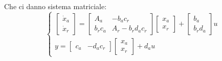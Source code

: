 Che ci danno sistema matriciale:
\[
    \begin{cases}
        \left[\begin{matrix}
            \dot{x}_a\\\dot{x}_r
        \end{matrix}\right] = \left[\begin{matrix}
            A_a & -b_ac_r \\ b_rc_a & A_r-b_rd_ac_r
        \end{matrix}\right] \left[\begin{matrix}
            x_a\\x_r
        \end{matrix}\right] + \left[\begin{matrix}
            b_a \\b_rd_a 
        \end{matrix}\right] u\\
        y = \left[\begin{matrix}
            c_a & -d_ac_r
        \end{matrix}\right] \left[\begin{matrix}
            x_a\\x_r
        \end{matrix}\right] + d_a u
    \end{cases}
\]